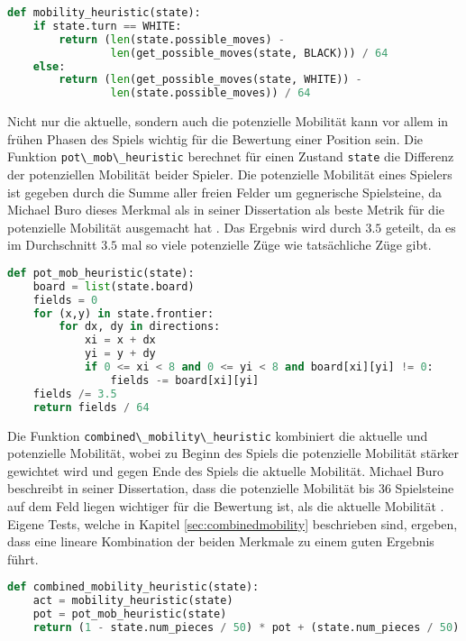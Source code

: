 \begin{lstlisting}[language=Python]
def mobility_heuristic(state):
    if state.turn == WHITE:
        return (len(state.possible_moves) -
                len(get_possible_moves(state, BLACK))) / 64
    else:
        return (len(get_possible_moves(state, WHITE)) -
                len(state.possible_moves)) / 64
\end{lstlisting}

Nicht nur die aktuelle, sondern auch die potenzielle Mobilität kann vor
allem in frühen Phasen des Spiels wichtig für die Bewertung einer
Position sein. Die Funktion
\passthrough{\lstinline!pot\_mob\_heuristic!} berechnet für einen
Zustand \passthrough{\lstinline!state!} die Differenz der potenziellen
Mobilität beider Spieler. Die potenzielle Mobilität eines Spielers ist
gegeben durch die Summe aller freien Felder um gegnerische Spielsteine,
da Michael Buro dieses Merkmal als in seiner Dissertation als beste
Metrik für die potenzielle Mobilität ausgemacht hat
\cite[S. 9]{evaluationfunctions}. Das Ergebnis wird durch \(3.5\)
geteilt, da es im Durchschnitt \(3.5\) mal so viele potenzielle Züge wie
tatsächliche Züge gibt.

\begin{lstlisting}[language=Python]
def pot_mob_heuristic(state):
    board = list(state.board)
    fields = 0
    for (x,y) in state.frontier:
        for dx, dy in directions:
            xi = x + dx
            yi = y + dy
            if 0 <= xi < 8 and 0 <= yi < 8 and board[xi][yi] != 0:
                fields -= board[xi][yi]
    fields /= 3.5 
    return fields / 64
\end{lstlisting}

Die Funktion \passthrough{\lstinline!combined\_mobility\_heuristic!}
kombiniert die aktuelle und potenzielle Mobilität, wobei zu Beginn des
Spiels die potenzielle Mobilität stärker gewichtet wird und gegen Ende
des Spiels die aktuelle Mobilität. Michael Buro beschreibt in seiner
Dissertation, dass die potenzielle Mobilität bis 36 Spielsteine auf dem
Feld liegen wichtiger für die Bewertung ist, als die aktuelle Mobilität
\cite[S. 9]{evaluationfunctions}. Eigene Tests, welche in Kapitel
\ref{sec:combinedmobility} beschrieben sind, ergeben, dass eine lineare
Kombination der beiden Merkmale zu einem guten Ergebnis führt.

\begin{lstlisting}[language=Python]
def combined_mobility_heuristic(state):
    act = mobility_heuristic(state)
    pot = pot_mob_heuristic(state)
    return (1 - state.num_pieces / 50) * pot + (state.num_pieces / 50) *  act
\end{lstlisting}

